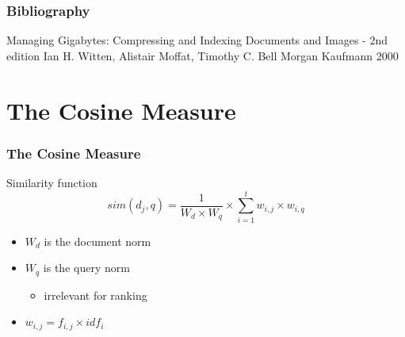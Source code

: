 \documentclass[svgnames]{beamer}
\subtitle{Querying}
\begin{document}
\maketitle
\makeoutline

\begin{frame}
    \frametitle{Bibliography}
    
    Managing Gigabytes: Compressing and Indexing Documents and Images - 2nd
    edition Ian H. Witten, Alistair Moffat, Timothy C. Bell Morgan Kaufmann
    2000

\end{frame}

\section{The Cosine Measure}

\begin{frame}
  \frametitle{The Cosine Measure}
  
  \begin{block}{Similarity function}
    \begin{displaymath}
      sim(d_j,q) =
         \frac{1}{W_d \times W_q}
         \times \sum_{i=1}^{t}w_{i,j} \times w_{i,q}
    \end{displaymath}
    \begin{itemize}
    \item $W_d$ is the document norm
    \item $W_q$ is the query norm
      \begin{itemize}
      \item irrelevant for ranking
      \end{itemize}
    \item $w_{i,j} = f_{i,j} \times idf_i$
    \end{itemize}
  \end{block}

\end{frame}

\end{document}
